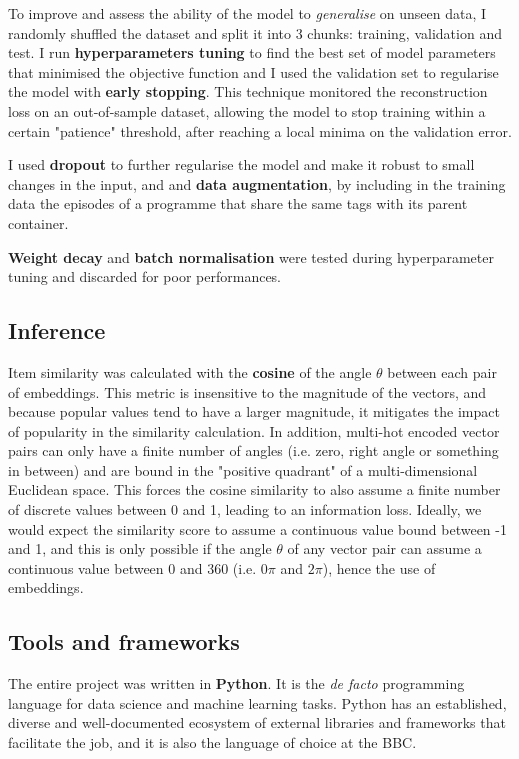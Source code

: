 To improve and assess the ability of the model to \textit{generalise} on unseen data, I randomly shuffled the dataset and split
it into 3 chunks: training, validation and test. I run \textbf{hyperparameters tuning} to find the best set of model parameters
that minimised the objective function and I used the validation set to regularise the model with \textbf{early stopping}.
This technique monitored the reconstruction loss on an out-of-sample dataset,
allowing the model to stop training within a certain "patience" threshold, after reaching a local minima on the validation error.

I used \textbf{dropout} to further regularise the model and make it robust to small changes in the input, and
and \textbf{data augmentation}, by including in the training data the episodes of a programme that share the same tags with its
parent container.

\textbf{Weight decay} and \textbf{batch normalisation} were tested during hyperparameter tuning and discarded for poor performances.%

\subsection{Inference}

Item similarity was calculated with the \textbf{cosine} of the angle $\theta$ between each pair of embeddings. This metric
is insensitive to the magnitude of the vectors, and because popular values tend to have a larger magnitude, it mitigates the impact of
popularity in the similarity calculation. In addition, multi-hot encoded vector pairs can only have a finite number of angles
(i.e. zero, right angle or something in between) and are bound in the "positive quadrant" of a multi-dimensional Euclidean space.
This forces the cosine similarity to also assume a finite number of discrete values between 0 and 1, leading to an information
loss. Ideally, we would expect the similarity score to assume a continuous value bound between -1 and 1, and this
is only possible if the angle $\theta$ of any vector pair can assume a continuous value between 0 and 360 (i.e. $0\pi$ and $2\pi$), hence
the use of embeddings.

\subsection{Tools and frameworks}

The entire project was written in \textbf{Python}. It is the \textit{de facto} programming language for data science
and machine learning tasks. Python has an established, diverse and well-documented ecosystem of external libraries
and frameworks that facilitate the job, and it is also the language of choice at the BBC.

